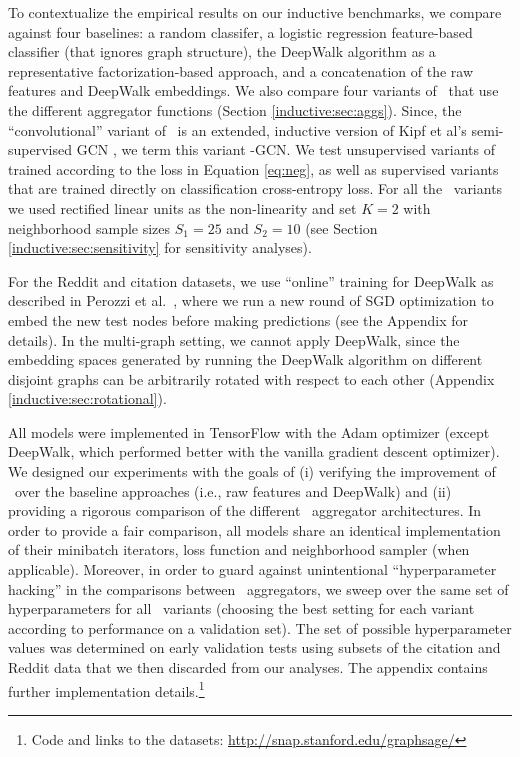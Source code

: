 To contextualize the empirical results on our inductive benchmarks, we compare against four baselines: 
a random classifer, a logistic regression feature-based classifier (that ignores graph structure), the DeepWalk algorithm \cite{perozzi2014deepwalk} as a representative factorization-based approach, and a
concatenation of the raw features and DeepWalk embeddings.
We also compare four variants of \name\ that use the different aggregator functions (Section \ref{inductive:sec:aggs}).
Since, the ``convolutional'' variant of \name\ is an extended, inductive version of Kipf et al's semi-supervised GCN \cite{kipf2016semi}, we term this variant \name-GCN.
We test unsupervised variants of \name\, trained according to the loss in Equation \eqref{eq:neg}, as well as supervised variants that are trained directly on classification cross-entropy loss.
For all the \name\ variants we used rectified linear units as the non-linearity and set $K=2$ with neighborhood sample sizes $S_1=25$ and $S_2=10$ (see Section \ref{inductive:sec:sensitivity} for sensitivity analyses).

For the Reddit and citation datasets, we use ``online'' training for DeepWalk as described in Perozzi et al.~\cite{perozzi2014deepwalk}, where we run a new round of SGD optimization to embed the new test nodes before making predictions (see the Appendix for details).
In the multi-graph setting, we cannot apply DeepWalk, since the embedding spaces generated by running the DeepWalk algorithm on different disjoint graphs can be arbitrarily rotated with respect to each other (Appendix \ref{inductive:sec:rotational}). 



All models were implemented in TensorFlow \cite{abadi2016tensorflow} with the Adam optimizer \cite{kingma2014adam} (except DeepWalk, which performed better with the vanilla gradient descent optimizer). 
We designed our experiments with the goals of (i) verifying the improvement of \name\ over the baseline approaches (i.e., raw features and DeepWalk) and (ii) providing a rigorous comparison of the different \name\ aggregator architectures. 
In order to provide a fair comparison, all models share an identical implementation of their minibatch iterators, loss function and neighborhood sampler (when applicable). 
Moreover, in order to guard against unintentional ``hyperparameter hacking'' in the comparisons between \name\ aggregators, we sweep over the same set of hyperparameters for all \name\ variants (choosing the best setting for each variant according to performance on a validation set). 
The set of possible hyperparameter values was determined on early validation tests using subsets of the citation and Reddit data that we then discarded from our analyses. 
The appendix contains further implementation details.\footnote{Code and links to the datasets:  \url{http://snap.stanford.edu/graphsage/}}




